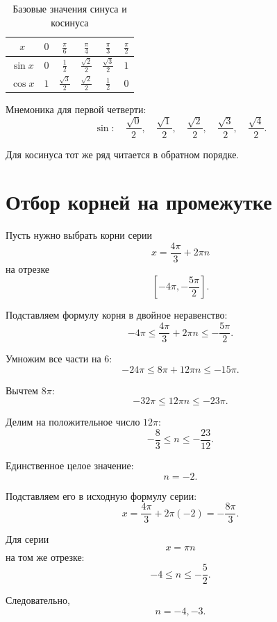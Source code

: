 \documentclass[a4paper,12pt]{article}
\begin{document}
\begin{table}[ht]
\centering
\renewcommand{\arraystretch}{1.28}

\caption{Базовые значения синуса и косинуса}

\begin{tabular}{@{}c*{5}{c}@{}}
\toprule

$x$
&
$0$
&
$\frac{\pi}{6}$
&
$\frac{\pi}{4}$
&
$\frac{\pi}{3}$
&
$\frac{\pi}{2}$
\\

\midrule

$\sin x$
&
$0$
&
$\frac12$
&
$\frac{\sqrt2}{2}$
&
$\frac{\sqrt3}{2}$
&
$1$
\\

$\cos x$
&
$1$
&
$\frac{\sqrt3}{2}$
&
$\frac{\sqrt2}{2}$
&
$\frac12$
&
$0$
\\

\bottomrule
\end{tabular}
\end{table}

Мнемоника для первой четверти:
\[
\sin:
\quad
\frac{\sqrt0}{2},
\quad
\frac{\sqrt1}{2},
\quad
\frac{\sqrt2}{2},
\quad
\frac{\sqrt3}{2},
\quad
\frac{\sqrt4}{2}.
\]

Для косинуса тот же ряд читается в обратном порядке.

\section{Отбор корней на промежутке}

Пусть нужно выбрать корни серии
\[
x=\frac{4\pi}{3}+2\pi n
\]
на отрезке
\[
\left[
-4\pi,
-\frac{5\pi}{2}
\right].
\]

Подставляем формулу корня в двойное неравенство:
\[
-4\pi
\le
\frac{4\pi}{3}+2\pi n
\le
-\frac{5\pi}{2}.
\]

Умножим все части на \(6\):
\[
-24\pi
\le
8\pi+12\pi n
\le
-15\pi.
\]

Вычтем \(8\pi\):
\[
-32\pi
\le
12\pi n
\le
-23\pi.
\]

Делим на положительное число \(12\pi\):
\[
-\frac83
\le
n
\le
-\frac{23}{12}.
\]

Единственное целое значение:
\[
n=-2.
\]

Подставляем его в исходную формулу серии:
\[
x
=
\frac{4\pi}{3}
+
2\pi(-2)
=
-\frac{8\pi}{3}.
\]

Для серии
\[
x=\pi n
\]
на том же отрезке:
\[
-4
\le
n
\le
-\frac52.
\]

Следовательно,
\[
n=-4,-3.
\]
\end{document}

